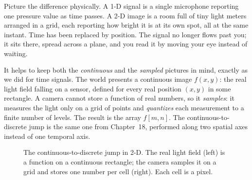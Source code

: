 \begin{intuitionbox}
Picture the difference physically. A 1-D signal is a single microphone reporting
one pressure value as time passes. A 2-D image is a room full of tiny
light meters arranged in a grid, each reporting how bright it is at its own spot,
all at the same instant. Time has been replaced by position. The signal no longer
flows past you; it sits there, spread across a plane, and you read it by moving
your eye instead of waiting.
\end{intuitionbox}

It helps to keep both the \emph{continuous} and the \emph{sampled} pictures in
mind, exactly as we did for time signals. The world presents a continuous image
$f(x,y)$: the real light field falling on a sensor, defined for every real
position $(x,y)$ in some rectangle. A camera cannot store a function of real
numbers, so it \emph{samples}: it measures the light only on a grid of points and
\emph{quantizes} each measurement to a finite number of levels. The result is the
array $f[m,n]$. The continuous-to-discrete jump is the same one from Chapter~18,
performed along two spatial axes instead of one temporal axis.

\begin{figure}[H]
\centering
{}
\caption{The continuous-to-discrete jump in 2-D. The real light field (left) is a
function on a continuous rectangle; the camera samples it on a grid and stores
one number per cell (right). Each cell is a pixel.}
\label{ch30:fig-sample}
\end{figure}

